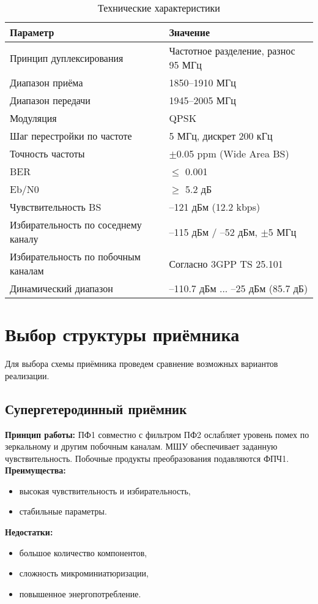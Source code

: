 \documentclass[a4paper,12pt]{article}
\begin{document}
\begin{table}[H]
\centering
\caption{Технические характеристики}
\label{tab:t1}
\begin{tabular}{|l|l|}
\hline
\textbf{Параметр} & \textbf{Значение} \\ \hline
Принцип дуплексирования & Частотное разделение, разнос 95 МГц \\ \hline
Диапазон приёма & 1850--1910 МГц \\ \hline
Диапазон передачи & 1945--2005 МГц \\ \hline
Модуляция & QPSK \\ \hline
Шаг перестройки по частоте & 5 МГц, дискрет 200 кГц \\ \hline
Точность частоты & $\pm$0.05 ppm (Wide Area BS) \\ \hline
BER & $\leq$ 0.001 \\ \hline
Eb/N0 & $\geq$ 5.2 дБ \\ \hline
Чувствительность BS & --121 дБм (12.2 kbps) \\ \hline
Избирательность по соседнему каналу & --115 дБм / --52 дБм, $\pm$5 МГц \\ \hline
Избирательность по побочным каналам & Согласно 3GPP TS 25.101 \\ \hline
Динамический диапазон & --110.7 дБм ... --25 дБм (85.7 дБ) \\ \hline
\end{tabular}
\end{table}

\section{Выбор структуры приёмника}
Для выбора схемы приёмника проведем сравнение возможных вариантов реализации.
\subsection{Супергетеродинный приёмник}
\textbf{Принцип работы:} \newline
ПФ1 совместно с фильтром ПФ2 ослабляет уровень помех по зеркальному и другим побочным каналам. МШУ обеспечивает заданную чувствительность. Побочные продукты преобразования подавляются ФПЧ1.
\newline
\newline
\textbf{Преимущества:}
\begin{itemize}
    \item высокая чувствительность и избирательность,
    \item стабильные параметры.
\end{itemize}
\textbf{Недостатки:}
\begin{itemize}
    \item большое количество компонентов,
    \item сложность микроминиатюризации,
    \item повышенное энергопотребление.
\end{itemize}
\end{document}
